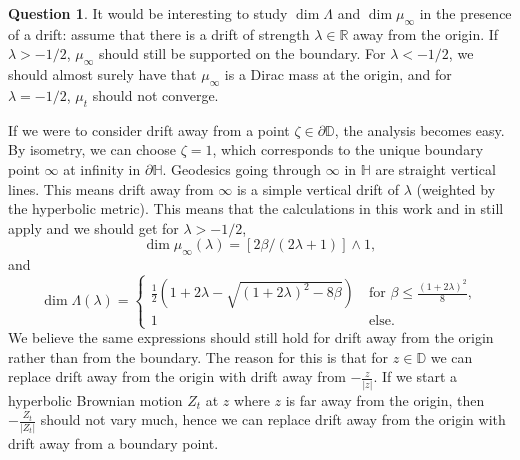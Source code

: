 \documentclass{article}
\theoremstyle{definition}
\newtheorem{quest}[thm]{Question}
\numberwithin{equation}{section}
\numberwithin{thm}{section}
\newcommand*{\RR}{\ensuremath{\mathbb{R}}}	        	%
\newcommand*{\DD}{\ensuremath{\mathbb{D}}}	        	%
\newcommand*{\HH}{\ensuremath{\mathbb{H}}}	        	%
\begin{document}
\begin{quest}
    It would be interesting to study $\dim \Lambda$ and $\dim \mu_\infty$ in the presence of a drift: assume that there is a drift of strength $\lambda \in \RR$ away from the origin. If $\lambda>-1/2$, $\mu_\infty$ {should} still be supported on the boundary. For $\lambda <-1/2$, we {should} almost surely have that $\mu_\infty$ is a Dirac mass at the origin, and for $\lambda=-1/2$, $\mu_t$ {should} not converge. 

    If we were to consider drift away from a point $\zeta\in \partial\DD$, the analysis becomes easy. By isometry, we can choose $\zeta =1${,} which corresponds to the unique boundary point $\infty$ at infinity in $\partial \HH$. Geodesics going through $\infty$ in $\HH$ are straight vertical lines. This means drift away from $\infty$ is a simple vertical drift of $\lambda$ (weighted by the hyperbolic metric). This means that {the} calculations in this work and in \cite{lalley_hyperbolic_1997} still apply and we should get for $\lambda>-1/2$,
    \begin{equation*}
    \dim  \mu_\infty(\lambda) = [2\beta/(2\lambda+1)]\wedge 1,
    \end{equation*}
    and
    \begin{equation*}
        \dim \Lambda(\lambda) =
        \begin{cases}
            \frac{1}{2}\left(1+2\lambda - \sqrt{(1+2\lambda)^2-8\beta}\right) \ &\text{for }\beta \leq \frac{(1+2\lambda)^2}{8}, \\
            1 & \text{else}.
        \end{cases}
    \end{equation*}
    We believe the same expressions should still hold for drift away from the origin rather than from the boundary. The reason for this is that for $z\in \DD$ we can replace drift away from the origin with drift away from $-\frac{z}{\vert z\vert}$. If we start a hyperbolic Brownian motion $Z_t$ at $z$ where $z$ is far away from the origin, then $-\frac{Z_t}{\vert Z_t\vert}$ should not vary much, hence we can replace drift away from the origin with drift away from a boundary point. 
\end{quest}
\end{document}
